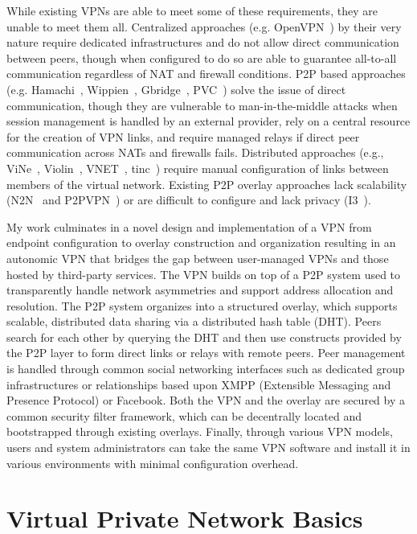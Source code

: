 While existing VPNs are able to meet some of these requirements, they are
unable to meet them all.  Centralized approaches (e.g.  OpenVPN~\cite{openvpn})
by their very nature require dedicated infrastructures and do not allow direct
communication between peers, though when configured to do so are able to
guarantee all-to-all communication regardless of NAT and firewall conditions.
P2P based approaches (e.g.  Hamachi~\cite{hamachi}, Wippien~\cite{wippien},
Gbridge~\cite{gbridge}, PVC~\cite{pvc}) solve the issue of direct
communication, though they are vulnerable to man-in-the-middle attacks when
session management is handled by an external provider, rely on a central
resource for the creation of VPN links, and require managed relays if direct
peer communication across NATs and firewalls fails.  Distributed approaches
(e.g., ViNe~\cite{vine}, Violin~\cite{violin}, VNET~\cite{vnet},
tinc~\cite{tinc}) require manual configuration of links between members of the
virtual network.  Existing P2P overlay approaches lack scalability
(N2N~\cite{n2n} and P2PVPN~\cite{p2pvpn}) or are difficult to configure and
lack privacy (I3~\cite{i3}).

My work culminates in a novel design and implementation of a VPN from endpoint
configuration to overlay construction and organization resulting in an
autonomic VPN that bridges the gap between user-managed VPNs and those hosted
by third-party services.  The VPN builds on top of a P2P system used to
transparently handle network asymmetries and support address allocation and
resolution.  The P2P system organizes into a structured overlay, which supports
scalable, distributed data sharing via a distributed hash table (DHT).  Peers
search for each other by querying the DHT and then use constructs provided by
the P2P layer to form direct links or relays with remote peers.  Peer
management is handled through common social networking interfaces such as
dedicated group infrastructures or relationships based upon XMPP (Extensible
Messaging and Presence Protocol) or Facebook.  Both the VPN and the overlay are
secured by a common security filter framework, which can be decentrally located
and bootstrapped through existing overlays.  Finally, through various VPN
models, users and system administrators can take the same VPN software and
install it in various environments with minimal configuration overhead.

\section{Virtual Private Network Basics}

